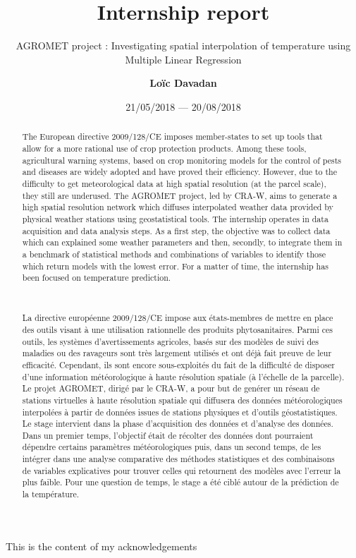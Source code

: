 \documentclass[12pt,twoside]{reedthesis}
\title{Internship report}
\author{\textbf{Loïc Davadan}}
\date{21/05/2018 --- 20/08/2018}
\subtitle{AGROMET project : Investigating spatial interpolation of temperature
using Multiple Linear Regression}
\theoremstyle{definition}
\theoremstyle{definition}
\theoremstyle{definition}
\theoremstyle{remark}
\begin{document}
  \maketitle

\frontmatter %
\pagestyle{empty} %
  \begin{acknowledgements}
    This is the content of my acknowledgements
  \end{acknowledgements}

  \begin{abstract}
    The European directive 2009/128/CE imposes member-states to set up tools
    that allow for a more rational use of crop protection products. Among
    these tools, agricultural warning systems, based on crop monitoring
    models for the control of pests and diseases are widely adopted and have
    proved their efficiency. However, due to the difficulty to get
    meteorological data at high spatial resolution (at the parcel scale),
    they still are underused. The AGROMET project, led by CRA-W, aims to
    generate a high spatial resolution network which diffuses interpolated
    weather data provided by physical weather stations using geostatistical
    tools. The internship operates in data acquisition and data analysis
    steps. As a first step, the objective was to collect data which can
    explained some weather parameters and then, secondly, to integrate them
    in a benchmark of statistical methods and combinations of variables to
    identify those which return models with the lowest error. For a matter
    of time, the internship has been focused on temperature prediction.
    
    ~ ~
    
    La directive européenne 2009/128/CE impose aux états-membres de mettre
    en place des outils visant à une utilisation rationnelle des produits
    phytosanitaires. Parmi ces outils, les systèmes d'avertissements
    agricoles, basés sur des modèles de suivi des maladies ou des ravageurs
    sont très largement utilisés et ont déjà fait preuve de leur efficacité.
    Cependant, ils sont encore sous-exploités du fait de la difficulté de
    disposer d'une information météorologique à haute résolution spatiale (à
    l'échelle de la parcelle). Le projet AGROMET, dirigé par le CRA-W, a
    pour but de genérer un réseau de stations virtuelles à haute résolution
    spatiale qui diffusera des données météorologiques interpolées à partir
    de données issues de stations physiques et d'outils géostatistiques. Le
    stage intervient dans la phase d'acquisition des données et d'analyse
    des données. Dans un premier temps, l'objectif était de récolter des
    données dont pourraient dépendre certains paramètres météorologiques
    puis, dans un second temps, de les intégrer dans une analyse comparative
    des méthodes statistiques et des combinaisons de variables explicatives
    pour trouver celles qui retournent des modèles avec l'erreur la plus
    faible. Pour une question de temps, le stage a été ciblé autour de la
    prédiction de la température.
  \end{abstract}
\end{document}

